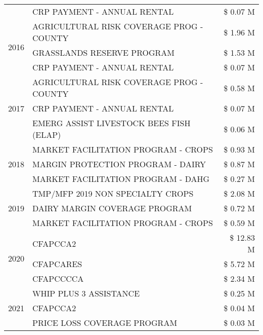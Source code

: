 \begin{tabular}{llr}
 & CRP PAYMENT - ANNUAL RENTAL & \$ 0.07 M \\
\cline{1-3}
\multirow[t]{3}{*}{2016} & AGRICULTURAL RISK COVERAGE PROG - COUNTY & \$ 1.96 M \\
 & GRASSLANDS RESERVE PROGRAM & \$ 1.53 M \\
 & CRP PAYMENT - ANNUAL RENTAL & \$ 0.07 M \\
\cline{1-3}
\multirow[t]{3}{*}{2017} & AGRICULTURAL RISK COVERAGE PROG - COUNTY & \$ 0.58 M \\
 & CRP PAYMENT - ANNUAL RENTAL & \$ 0.07 M \\
 & EMERG ASSIST LIVESTOCK BEES FISH (ELAP) & \$ 0.06 M \\
\cline{1-3}
\multirow[t]{3}{*}{2018} & MARKET FACILITATION PROGRAM - CROPS & \$ 0.93 M \\
 & MARGIN PROTECTION PROGRAM - DAIRY & \$ 0.87 M \\
 & MARKET FACILITATION PROGRAM - DAHG & \$ 0.27 M \\
\cline{1-3}
\multirow[t]{3}{*}{2019} & TMP/MFP 2019 NON SPECIALTY CROPS & \$ 2.08 M \\
 & DAIRY MARGIN COVERAGE PROGRAM & \$ 0.72 M \\
 & MARKET FACILITATION PROGRAM - CROPS & \$ 0.59 M \\
\cline{1-3}
\multirow[t]{3}{*}{2020} & CFAPCCA2 & \$ 12.83 M \\
 & CFAPCARES & \$ 5.72 M \\
 & CFAPCCCCA & \$ 2.34 M \\
\cline{1-3}
\multirow[t]{3}{*}{2021} & WHIP PLUS 3 ASSISTANCE & \$ 0.25 M \\
 & CFAPCCA2 & \$ 0.04 M \\
 & PRICE LOSS COVERAGE PROGRAM & \$ 0.03 M \\
\cline{1-3}
\bottomrule
\end{tabular}
